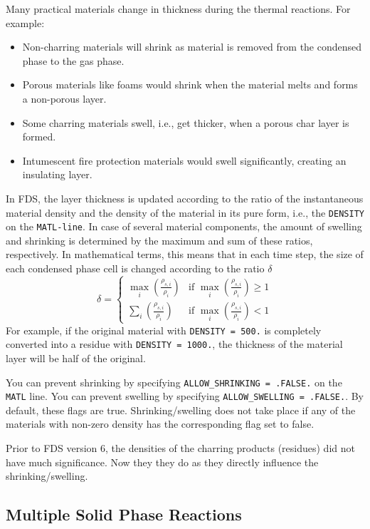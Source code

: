 \documentclass[11pt]{book}
\newcommand{\ct}{\tt\small}
\newcommand{\be}{\begin{equation}}
\newcommand{\ee}{\end{equation}}
\begin{document}
Many practical materials change in thickness during the thermal reactions. For example:
\begin{itemize}
\item Non-charring materials will shrink as material is removed from the condensed
phase to the gas phase.
\item Porous materials like foams would shrink when the material melts and forms a non-porous layer.
\item Some charring materials swell, i.e., get thicker, when a porous char layer is formed.
\item Intumescent fire protection materials would swell significantly, creating an insulating layer.
\end{itemize}
In FDS, the layer thickness is updated according to the ratio of the instantaneous material density and the density of the material in its pure form, i.e.,
the {\ct DENSITY} on the {\ct MATL-line}. In case of several material components, the amount of swelling and shrinking is determined by the maximum and sum
of these ratios, respectively. In mathematical terms, this means that in each time step,
the size of each condensed phase cell is changed according to the ratio $\delta$
\be
\delta =
   \begin{cases}
   \max_i\left(\frac{\rho_{s,i}}{\rho_i}\right) & \text{if }\max_i\left(\frac{\rho_{s,i}}{\rho_i}\right)\geq 1 \\
   \sum_i\left(\frac{\rho_{s,i}}{\rho_i}\right) & \text{if }\max_i\left(\frac{\rho_{s,i}}{\rho_i}\right)<1
   \end{cases}
\ee
For example, if the original material with {\ct DENSITY = 500.} is completely converted into a residue with {\ct DENSITY = 1000.}, the thickness
of the material layer will be half of the original.

You can prevent shrinking by specifying {\ct ALLOW\_SHRINKING = .FALSE.} on the {\ct MATL} line. You can prevent swelling by specifying
{\ct ALLOW\_SWELLING = .FALSE.}. By default, these flags are true. Shrinking/swelling does not take place if any of the materials with non-zero density
has the corresponding flag set to false.

\begin{warning}
Prior to FDS version 6, the densities of the charring products (residues) did not have much significance. Now they they do as they directly
influence the shrinking/swelling.
\end{warning}

\subsection{Multiple Solid Phase Reactions}
\end{document}
